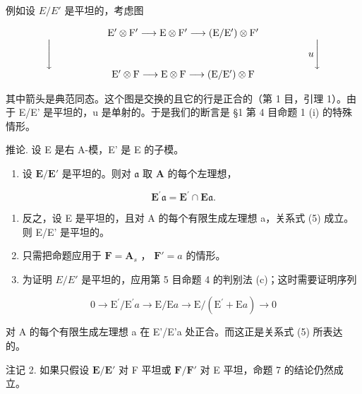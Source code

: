 例如设 \(E/E'\) 是平坦的，考虑图

\[
\begin{array}{c} \mathrm{E} ^ {\prime} \otimes \mathrm{F} ^ {\prime} \longrightarrow \mathrm{E} \otimes \mathrm{F} ^ {\prime} \longrightarrow (\mathrm{E} / \mathrm{E} ^ {\prime}) \otimes \mathrm{F} ^ {\prime} \\ \Biggl \downarrow \qquad \qquad \qquad \qquad \qquad \qquad \qquad \qquad \qquad \qquad \qquad \qquad \qquad u \Biggl \downarrow \\ \mathrm{E} ^ {\prime} \otimes \mathrm{F} \longrightarrow \mathrm{E} \otimes \mathrm{F} \longrightarrow (\mathrm{E} / \mathrm{E} ^ {\prime}) \otimes \mathrm{F} \end{array}
\]

其中箭头是典范同态。这个图是交换的且它的行是正合的（第 1 目，引理 1）。由于 E/E' 是平坦的，u 是单射的。于是我们的断言是 §1 第 4 目命题 1 (i) 的特殊情形。

推论. 设 E 是右 A-模，E' 是 E 的子模。

\begin{enumerate}
\def\labelenumi{(\roman{enumi})}
\tightlist
\item
  设 \(\mathbf{E} / \mathbf{E}'\) 是平坦的。则对 \(\mathfrak{a}\) 取 \(\mathbf{A}\) 的每个左理想，
\end{enumerate}

\[
\mathbf {E} ^ {\prime} \mathfrak {a} = \mathbf {E} ^ {\prime} \cap \mathbf {E} \mathfrak {a}.\tag{5}
\]

\begin{enumerate}
\def\labelenumi{(\roman{enumi})}
\setcounter{enumi}{1}
\item
  反之，设 E 是平坦的，且对 A 的每个有限生成左理想 a，关系式 (5) 成立。则 E/E' 是平坦的。
\item
  只需把命题应用于 \(\mathbf{F} = \mathbf{A}_s\) ， \(\mathbf{F}' = a\) 的情形。
\item
  为证明 \(E/E'\) 是平坦的，应用第 5 目命题 4 的判别法 (c)；这时需要证明序列
\end{enumerate}

\[
0 \rightarrow \mathrm{E} ^ {\prime} / \mathrm{E} ^ {\prime} a \rightarrow \mathrm{E} / \mathrm{E} a \rightarrow \mathrm{E} / (\mathrm{E} ^ {\prime} + \mathrm{E} a) \rightarrow 0
\]

对 A 的每个有限生成左理想 a 在 E'/E'a 处正合。而这正是关系式 (5) 所表达的。

注记 2. 如果只假设 \(\mathbf{E} / \mathbf{E}'\) 对 F 平坦或 \(\mathbf{F} / \mathbf{F}'\) 对 E 平坦，命题 7 的结论仍然成立。

